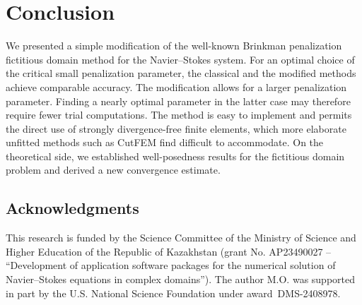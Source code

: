 \documentclass[11pt]{article}
\begin{document}
\section*{Conclusion}
We presented a simple modification of the well-known Brinkman penalization fictitious domain method for the Navier–Stokes system. For an optimal choice of the critical small penalization parameter, the classical and the modified methods achieve comparable accuracy. {The modification allows for a larger penalization parameter. Finding a nearly optimal parameter in the latter case may therefore require fewer trial computations.} The method is easy to implement and permits the direct use of strongly divergence-free finite elements, which more elaborate unfitted methods such as CutFEM find difficult to accommodate. On the theoretical side, we established well-posedness results for the fictitious domain problem and derived a new convergence estimate. 


\subsection*{Acknowledgments} This research is funded by the Science Committee of the Ministry of Science and Higher Education of the Republic of Kazakhstan (grant No. AP23490027 – “Development of application software packages for the numerical solution of Navier–Stokes equations in complex domains”). The author M.O. was supported in part by the U.S. National Science Foundation under award DMS-2408978.

\small

{}
\end{document}

